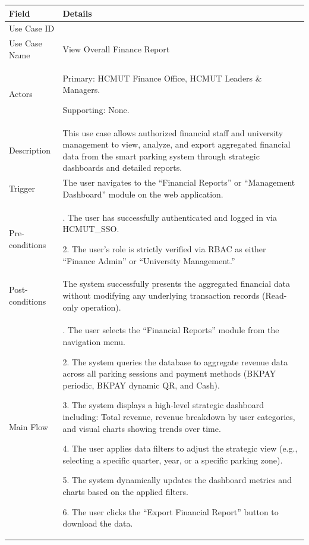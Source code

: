 \begin{table}[H]
\small
\renewcommand{\arraystretch}{1.4}
\begin{tabularx}{\textwidth}{|>{\raggedright\arraybackslash}p{3.5cm}|>{\RaggedRight\arraybackslash}X|}
\hline
\rowcolor{gray!20} \textbf{Field} & \textbf{Details} \\
\hline
Use Case ID & 3.5 \\
\hline
Use Case Name & View Overall Finance Report \\
\hline
Actors & Primary: HCMUT Finance Office, HCMUT Leaders \& Managers. \par Supporting: None. \\
\hline
Description & This use case allows authorized financial staff and university management to view, analyze, and export aggregated financial data from the smart parking system through strategic dashboards and detailed reports. \\
\hline
Trigger & The user navigates to the ``Financial Reports'' or ``Management Dashboard'' module on the web application. \\
\hline
Pre-conditions & 1. The user has successfully authenticated and logged in via HCMUT\_SSO. \par 2. The user's role is strictly verified via RBAC as either ``Finance Admin'' or ``University Management.'' \\
\hline
Post-conditions & The system successfully presents the aggregated financial data without modifying any underlying transaction records (Read-only operation). \\
\hline
Main Flow & 
1. The user selects the ``Financial Reports'' module from the navigation menu. \par
2. The system queries the database to aggregate revenue data across all parking sessions and payment methods (BKPAY periodic, BKPAY dynamic QR, and Cash). \par
3. The system displays a high-level strategic dashboard including: Total revenue, revenue breakdown by user categories, and visual charts showing trends over time. \par
4. The user applies data filters to adjust the strategic view (e.g., selecting a specific quarter, year, or a specific parking zone). \par
5. The system dynamically updates the dashboard metrics and charts based on the applied filters. \par
6. The user clicks the ``Export Financial Report'' button to download the data. \par

\end{tabularx}
\end{table}
